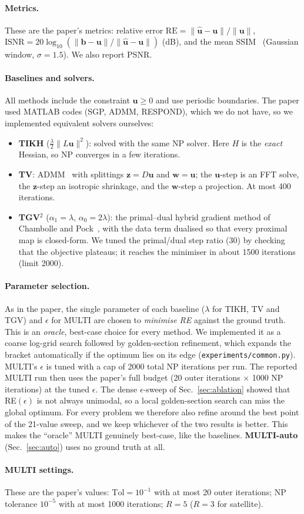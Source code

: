 \paragraph{Metrics.}
These are the paper's metrics: relative error
$\mathrm{RE}=\|\hat{\mathbf u}-\mathbf u\|/\|\mathbf u\|$,
$\mathrm{ISNR}=20\log_{10}(\|\mathbf b-\mathbf u\|/\|\hat{\mathbf u}-\mathbf u\|)$ (dB),
and the mean SSIM~\cite{ssim} (Gaussian window, $\sigma=1.5$). We also report PSNR.

\paragraph{Baselines and solvers.}
All methods include the constraint $\mathbf u\ge0$ and use periodic boundaries.
The paper used MATLAB codes (SGP, ADMM, RESPOND), which we do not have, so we
implemented equivalent solvers ourselves:
\begin{itemize}[leftmargin=*,itemsep=1pt]
\item \textbf{TIKH} ($\frac\lambda2\|L\mathbf u\|^2$): solved with the same NP solver.
  Here $H$ is the \emph{exact} Hessian, so NP converges in a few iterations.
\item \textbf{TV}: ADMM~\cite{admm} with splittings $\mathbf z=D\mathbf u$ and $\mathbf w=\mathbf u$; the
  $\mathbf u$-step is an FFT solve, the $\mathbf z$-step an isotropic shrinkage, and the
  $\mathbf w$-step a projection. At most 400 iterations.
\item \textbf{TGV$^2$} ($\alpha_1=\lambda$, $\alpha_0=2\lambda$): the primal--dual hybrid
  gradient method of Chambolle and Pock~\cite{cp}, with the data term dualised so that every
  proximal map is closed-form. We tuned the primal/dual step ratio (30) by checking
  that the objective plateaus; it reaches the minimiser in about 1500 iterations
  (limit 2000).
\end{itemize}

\paragraph{Parameter selection.}
As in the paper, the single parameter of each baseline ($\lambda$ for TIKH, TV
and TGV) and $\epsilon$ for MULTI are chosen to \emph{minimise RE} against the
ground truth. This is an \emph{oracle}, best-case choice for every method. We
implemented it as a coarse log-grid search followed by golden-section refinement,
which expands the bracket automatically if the optimum lies on its edge
(\texttt{experiments/common.py}). MULTI's $\epsilon$ is tuned with a cap of
2000 total NP iterations per run. The reported MULTI run then uses the paper's
full budget (20 outer iterations $\times$ 1000 NP iterations) at the tuned $\epsilon$.
The dense $\epsilon$-sweep of Sec.~\ref{sec:ablation} showed that RE$(\epsilon)$ is not
always unimodal, so a local golden-section search can miss the global optimum. For
every problem we therefore also refine around the best point of the 21-value sweep,
and we keep whichever of the two results is better. This makes the ``oracle'' MULTI
genuinely best-case, like the baselines.
\textbf{MULTI-auto} (Sec.~\ref{sec:auto}) uses no ground truth at all.

\paragraph{MULTI settings.}
These are the paper's values: $\mathrm{Tol}=10^{-1}$ with at most 20 outer
iterations; NP tolerance $10^{-5}$ with at most 1000 iterations;
$R=5$ ($R=3$ for satellite).
